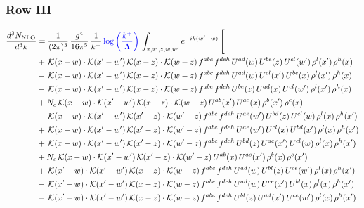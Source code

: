 \documentclass[9pt]{article}
\numberwithin{equation}{section}
\begin{document}
 \subsubsection{Row III}
 \begin{align}
\frac{d^{3}N_{\mathrm{NLO}}}{d^{3}k} & = \frac{1}{(2\pi)^{3}}\,\frac{g^{4}}{16\pi^{5}}\,\frac{1}{k^{+}}\,{\color{blue}\log{\left(\frac{k^{+}}{\Lambda}\right)}}\,\int_{x,x',z,w,w'}e^{-ik(w'-w)}\,\Bigg[\notag\\ &  +\,\mathcal{K}(x-w)\cdot\mathcal{K}(x'-w')\,\mathcal{K}(x-z)\cdot\mathcal{K}(w-z)\,f^{abc}\,f^{deh}\,U^{ad}(w)\,U^{be}(z)\,U^{cl}(w')\,\rho^{l}(x')\,\rho^{h}(x)\notag\\
& -\,\mathcal{K}(x-w)\cdot\mathcal{K}(x'-w')\,\mathcal{K}(x-z)\cdot\mathcal{K}(w-z)\,f^{abc}\,f^{deh}\,U^{ad}(w)\,U^{cl}(x')\,U^{be}(x)\,\rho^{l}(x')\,\rho^{h}(x)\notag\\
& -\,\mathcal{K}(x-w)\cdot\mathcal{K}(x'-w')\,\mathcal{K}(x-z)\cdot\mathcal{K}(w-z)\,f^{abc}\,f^{deh}\,U^{be}(z)\,U^{ad}(x)\,U^{cl}(w')\,\rho^{l}(x')\,\rho^{h}(x)\notag\\
& +N_{c}\,\mathcal{K}(x-w)\cdot\mathcal{K}(x'-w')\,\mathcal{K}(x-z)\cdot\mathcal{K}(w-z)\,U^{ab}(x')\,U^{ac}(x)\,\rho^{b}(x')\,\rho^{c}(x)\notag\\
& -\,\mathcal{K}(x-w)\cdot\mathcal{K}(x'-w')\,\mathcal{K}(x'-z)\cdot\mathcal{K}(w'-z)\,f^{abc}\,f^{deh}\,U^{ae}(w')\,U^{bd}(z)\,U^{cl}(w)\,\rho^{l}(x)\,\rho^{h}(x')\notag\\
& +\,\mathcal{K}(x-w)\cdot\mathcal{K}(x'-w')\,\mathcal{K}(x'-z)\cdot\mathcal{K}(w'-z)\,f^{abc}\,f^{deh}\,U^{ae}(w')\,U^{cl}(x)\,U^{bd}(x')\,\rho^{l}(x)\,\rho^{h}(x')\notag\\
& +\,\mathcal{K}(x-w)\cdot\mathcal{K}(x'-w')\,\mathcal{K}(x'-z)\cdot\mathcal{K}(w'-z)\,f^{abc}\,f^{deh}\,U^{bd}(z)\,U^{ae}(x')\,U^{cl}(w)\,\rho^{l}(x)\,\rho^{h}(x')\notag\\
& +N_{c}\,\mathcal{K}(x-w)\cdot\mathcal{K}(x'-w')\,\mathcal{K}(x'-z)\cdot\mathcal{K}(w'-z)\,U^{ab}(x)\,U^{ac}(x')\,\rho^{b}(x)\,\rho^{c}(x')\notag\\
& +\,\mathcal{K}(x'-w)\cdot\mathcal{K}(x'-w')\,\mathcal{K}(x-z)\cdot\mathcal{K}(w-z)\,f^{abc}\,f^{deh}\,U^{ad}(w)\,U^{bl}(z)\,U^{ce}(w')\,\rho^{l}(x)\,\rho^{h}(x')\notag\\
& -\,\mathcal{K}(x'-w)\cdot\mathcal{K}(x'-w')\,\mathcal{K}(x-z)\cdot\mathcal{K}(w-z)\,f^{abc}\,f^{deh}\,U^{ad}(w)\,U^{ce}(x')\,U^{bl}(x)\,\rho^{l}(x)\,\rho^{h}(x')\notag\\
& -\,\mathcal{K}(x'-w)\cdot\mathcal{K}(x'-w')\,\mathcal{K}(x-z)\cdot\mathcal{K}(w-z)\,f^{abc}\,f^{deh}\,U^{bl}(z)\,U^{ad}(x')\,U^{ce}(w')\,\rho^{l}(x)\,\rho^{h}(x')\notag\\

\end{align}
\end{document}
